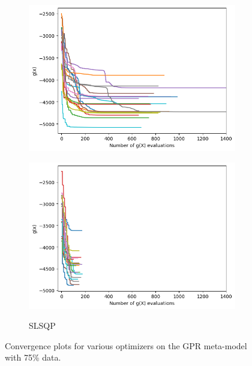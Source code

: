 \begin{figure}[!h]
\begin{subfigure}[b]{0.49\textwidth}
         \includegraphics[width=\textwidth]{image/75gprNelderMead_itrs.png}
         \label{fig:conv_neldermead}
     \end{subfigure}
     \hfill
     \begin{subfigure}[b]{0.49\textwidth}
         \centering
         \caption{SLSQP}
         \includegraphics[width=\textwidth]{image/75gprSLSQP_itrs.png}
         \label{fig:conv_slsqp}
     \end{subfigure}
        \caption{Convergence plots for various optimizers on the GPR meta-model with 75\% data.}
        \label{fig:convergence_plots}
\end{figure}
